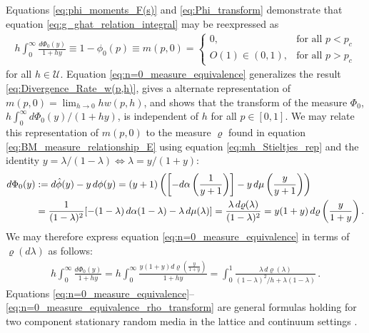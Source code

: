 \documentclass[english,12pt]{ttuthes}
\newcommand{\ph}{\hat{\phi}}
\begin{document}
Equations \eqref{eq:phi_moments_F(s)} and \eqref{eq:Phi_transform}
demonstrate that equation \eqref{eq:g_ghat_relation_integral} may be
reexpressed as  
%
\begin{align}\label{eq:n=0_measure_equivalence}
 h \int_0^\infty\frac{d\Phi_0(y)}{1+hy}\equiv1-\phi_0(p)\equiv m(p,0)=
         \begin{cases}
         0, & \text{for all } p<p_c \\
         O(1)\in(0,1), & \text{for all } p>p_c
         \end{cases}         
\end{align}
%
for all $h\in\mathcal{U}$. Equation \eqref{eq:n=0_measure_equivalence}
generalizes the result \eqref{eq:Divergence_Rate_w(p,h)}, gives a
alternate representation of $m(p,0)=\lim_{h\to0}hw(p,h)$, and shows that
the transform of the measure $\Phi_0$, $h\int_0^\infty d\Phi_0(y)/(1+hy)$, is
independent of $h$ for all $p\in[0,1]$. We may relate this
representation of $m(p,0)$ to the measure $\varrho$ found in equation
\eqref{eq:BM_measure_relationship_E} using equation
\eqref{eq:mh_Stieltjes_rep} and the identity $y=\lambda/(1-\lambda)\iff\lambda=y/(1+y)$:      
%
\begin{align}\label{eq:Measure_equivalence_rho}
  d\Phi_0(y)&:=d\ph(y)-y\,d\phi(y)
        =(y+1)\left(\left[-d\alpha\left(\frac{1}{y+1}\right)\right]
                    -y\,d\mu\left(\frac{y}{y+1}\right)
              \right)\\
        &=\frac{1}{(1-\lambda)^2}[-(1-\lambda)\,d\alpha(1-\lambda)-\lambda\,d\mu(\lambda)]
        =\frac{\lambda\,d\varrho(\lambda)}{(1-\lambda)^2}=y(1+y)\,d\varrho\left(\frac{y}{1+y}\right).\notag
\end{align}
%
We may therefore express equation \eqref{eq:n=0_measure_equivalence}
in terms of $\varrho(d\lambda)$ as follows: 
%
\begin{align}\label{eq:n=0_measure_equivalence_rho_transform}
   h\int_0^\infty\frac{d\Phi_0(y)}{1+hy}
      =h\int_0^\infty\frac{y(1+y)d\varrho(\frac{y}{1+y})}{1+hy}
      =\int_0^1\frac{\lambda\,d\varrho(\lambda)}{(1-\lambda)^2/h+\lambda(1-\lambda)}\,.
\end{align}
%
Equations 
\eqref{eq:n=0_measure_equivalence}--\eqref{eq:n=0_measure_equivalence_rho_transform}
are general formulas holding for two component stationary random media
in the lattice and continuum settings \cite{Golden:PRL-3935}. 
%
\end{document}
